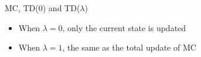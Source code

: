 \documentclass[aspectratio=169]{../latex_main/tntbeamer}  %
\begin{document}
\begin{frame}[c]{MC, TD(0) and TD($\lambda$)}
	
	
	\begin{itemize}
		\item When $\lambda = 0$, only the current state is updated
		\item When $\lambda = 1$, the same as the total update of MC
	\end{itemize}
	
\end{frame}

\end{document}
